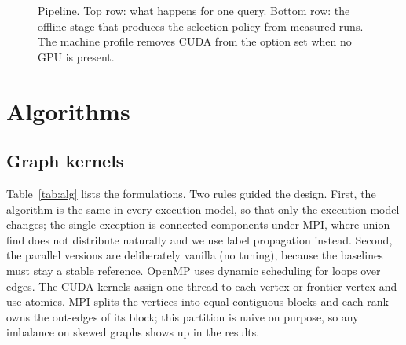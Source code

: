 \documentclass[conference]{IEEEtran}
\begin{document}
\begin{figure}[!t]
\centering
{}
\caption{Pipeline. Top row: what happens for one query. Bottom row: the offline stage that produces the selection policy from measured runs. The machine profile removes CUDA from the option set when no GPU is present.}
\label{fig:pipeline}
\end{figure}

\section{Algorithms}
\subsection{Graph kernels}
Table~\ref{tab:alg} lists the formulations. Two rules guided the design. First, the algorithm is the same in every execution model, so that only the execution model changes; the single exception is connected components under MPI, where union-find does not distribute naturally and we use label propagation instead. Second, the parallel versions are deliberately vanilla (no tuning), because the baselines must stay a stable reference. OpenMP uses dynamic scheduling for loops over edges. The CUDA kernels assign one thread to each vertex or frontier vertex and use atomics. MPI splits the vertices into equal contiguous blocks and each rank owns the out-edges of its block; this partition is naive on purpose, so any imbalance on skewed graphs shows up in the results.
\end{document}
